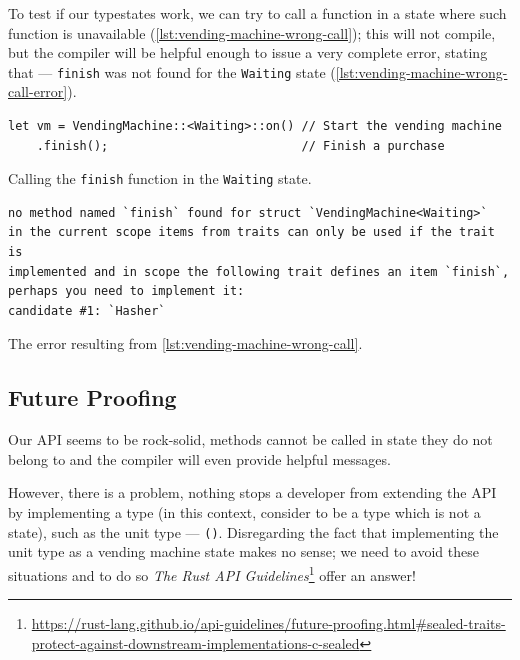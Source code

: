To test if our typestates work, we can try to call a function in a state where such function is unavailable (\autoref{lst:vending-machine-wrong-call});
this will not compile, but the compiler will be helpful enough to issue a very complete error, stating that ---
\texttt{finish} was not found for the \texttt{Waiting} state (\autoref{lst:vending-machine-wrong-call-error}).

\begin{listing}
    \begin{verbatim}
let vm = VendingMachine::<Waiting>::on() // Start the vending machine
    .finish();                           // Finish a purchase
\end{verbatim}
    \caption{Calling the \texttt{finish} function in the \texttt{Waiting} state.}
    \label{lst:vending-machine-wrong-call}
\end{listing}

\begin{listing}
    \begin{verbatim}
no method named `finish` found for struct `VendingMachine<Waiting>`
in the current scope items from traits can only be used if the trait is
implemented and in scope the following trait defines an item `finish`,
perhaps you need to implement it:
candidate #1: `Hasher`
\end{verbatim}
    \caption{The error resulting from \autoref{lst:vending-machine-wrong-call}.}
    \label{lst:vending-machine-wrong-call-error}
\end{listing}

\subsection{Future Proofing}\label{sec:typestates-hard-way:future}

Our \gls{API} seems to be rock-solid,
methods cannot be called in state they do not belong to and the compiler will even provide helpful messages.

However, there is a problem, nothing stops a developer from extending the \gls{API} by implementing a  type
(in this context, consider  to be a type which is not a state), such as the unit type --- \texttt{()}.
Disregarding the fact that implementing the unit type as a vending machine state makes no sense;
we need to avoid these situations and to do so \emph{The Rust API Guidelines}\footnote{\url{https://rust-lang.github.io/api-guidelines/future-proofing.html\#sealed-traits-protect-against-downstream-implementations-c-sealed}} offer an answer! %

